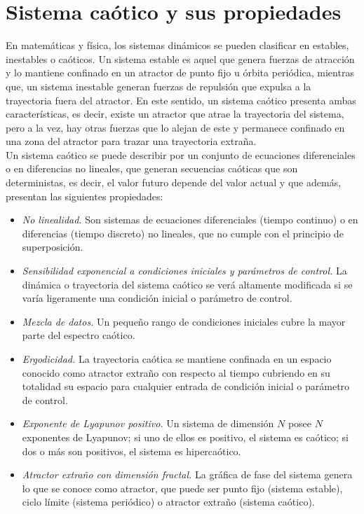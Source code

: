 \section{Sistema caótico y sus propiedades}
En matemáticas y física, los sistemas dinámicos se pueden clasificar en estables, inestables o caóticos. Un sistema estable es aquel que genera fuerzas de atracción y lo mantiene confinado en un atractor de punto fijo u órbita periódica, mientras que, un sistema inestable generan fuerzas de repulsión que expulsa a la trayectoria fuera del atractor. En este sentido, un sistema caótico presenta ambas características, es decir, existe un atractor que atrae la trayectoria del sistema, pero a la vez, hay otras fuerzas que lo alejan de este y permanece confinado en una zona del atractor para trazar una trayectoria extraña. \\   

Un sistema caótico se puede describir por un conjunto de ecuaciones diferenciales o en diferencias no lineales, que generan secuencias caóticas que son deterministas, es decir, el valor futuro depende del valor actual y que además, presentan las siguientes propiedades: \\

\begin{itemize}
\item \textit{No linealidad.} Son sistemas de ecuaciones diferenciales (tiempo continuo) o en diferencias (tiempo discreto) no lineales, que no cumple con el principio de superposición. 
\item \textit{Sensibilidad exponencial a condiciones iniciales y parámetros de control.} La dinámica o trayectoria del sistema caótico se verá altamente modificada si se varía ligeramente una condición inicial o parámetro de control. 
\item \textit{Mezcla de datos.} Un pequeño rango de condiciones iniciales cubre la mayor parte del espectro caótico.
\item \textit{Ergodicidad.} La trayectoria caótica se mantiene confinada en un espacio conocido como atractor extraño con respecto al tiempo cubriendo en su totalidad su espacio para cualquier entrada de condición inicial o parámetro de control.
\item \textit{Exponente de Lyapunov positivo.} Un sistema de dimensión $N$ posee $N$ exponentes de Lyapunov; si uno de ellos es positivo, el sistema es caótico; si dos o más son positivos, el sistema es hipercaótico.
\item \textit{Atractor extraño con dimensión fractal.} La gráfica de fase del sistema genera lo que se conoce como atractor, que puede ser punto fijo (sistema estable), ciclo límite (sistema periódico) o atractor extraño (sistema caótico).
\end{itemize}

